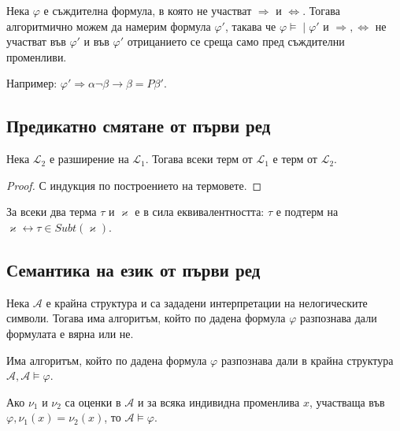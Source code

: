 \documentclass{article}
\newcommand{\mymod}{\models\!\mid}
\begin{document}
\begin{claim}
Нека $\varphi$ е съждителна формула, в която не участват $\Rightarrow$ и $\Leftrightarrow$. Тогава алгоритмично можем да намерим формула $\varphi'$, такава че $\varphi \mymod \varphi'$ и $\Rightarrow, \Leftrightarrow$ не участват във $\varphi'$ и във $\varphi'$ отрицанието се среща само пред съждителни променливи.

Например: $\varphi' \Rightarrow \alpha\neg\beta \rightarrow \beta = P\beta'$.
\end{claim}

\subsection*{Предикатно смятане от първи ред}

\begin{claim}
Нека $\mathcal{L}_2$ е разширение на $\mathcal{L}_1$. Тогава всеки терм от $\mathcal{L}_1$ е терм от $\mathcal{L}_2$.

\begin{proof}
С индукция по построението на термовете.
\end{proof}
\end{claim}

\begin{claim}
За всеки два терма $\tau$ и $\varkappa$ е в сила еквивалентността: $\tau$ е подтерм на $\varkappa \longleftrightarrow \tau \in Subt(\varkappa)$.
\end{claim}

\subsection*{Семантика на език от първи ред}

\begin{claim}
Нека $\mathcal{A}$ е крайна структура и са зададени интерпретации на нелогическите символи. Тогава има алгоритъм, който по дадена формула $\varphi$ разпознава дали формулата е вярна или не.

\setcounter{conseq}{0}
\begin{conseq}
Има алгоритъм, който по дадена формула $\varphi$ разпознава дали в крайна структура $\mathcal{A}, \mathcal{A} \models \varphi$.
\end{conseq}
\end{claim}

\begin{claim}
Ако $\nu_1$ и $\nu_2$ са оценки в $\mathcal{A}$ и за всяка индивидна променлива $x$, участваща във $\varphi, \nu_1(x) = \nu_2(x)$, то $\mathcal{A} \models \varphi$.
\end{claim}
\end{document}
